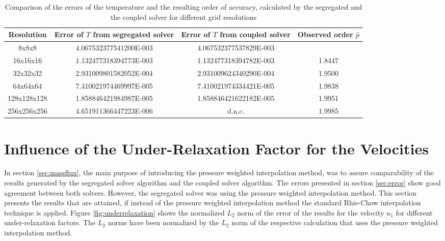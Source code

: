 \begin{table}[h!]\centering
{}
  \caption{Comparison of the errors of the temperature and the resulting order of accuracy, calculated by the segregated and the coupled solver for different grid resolutions}
  \begin{tabular}{cccc}\toprule
    Resolution & Error of \(T\) from segregated solver & Error of \(T\) from coupled solver & Observed order \(\hat{p}\) \\
    \midrule
    \rowcolor{tud0a} 8x8x8       & 4.067532377541200E-003  & 4.067532377537829E-003  &        \\%
    \rowcolor{black!00} 16x16x16    & 1.132477318394773E-003  & 1.132477318394782E-003  & 1.8447 \\%
    \rowcolor{tud0a} 32x32x32    & 2.931009801582052E-004  & 2.931009624340290E-004  & 1.9500 \\%
    \rowcolor{black!00} 64x64x64    & 7.410021974469997E-005  & 7.410021974334421E-005  & 1.9838 \\%
    \rowcolor{tud0a} 128x128x128 & 1.858846421984987E-005  & 1.858846421622182E-005  & 1.9951 \\%
    \rowcolor{black!00} 256x256x256 & 4.651911366447223E-006  & d.n.c.                  & 1.9985 \\%
  \end{tabular}
  \label{tab:temporder}
\end{table}

\section{Influence of the Under-Relaxation Factor for the Velocities}
\label{sec:independence}

In section \ref{sec:massflux}, the main purpose of introducing the pressure weighted interpolation method, was to assure comparability of the results generated by the segregated solver algorithm and the coupled solver algorithm. The errors presented in section \ref{sec:error} show good agreement between both solvers. However, the segregated solver was using the pressure weighted interpolation method. This section presents the results that are attained, if instead of the pressure weighted interpolation method the standard Rhie-Chow interpolation technique is applied. Figure \ref{fig:underrelaxation} shows the normalized \(L_2\) norm of the error of the results for the velocity \(u_1\) for different under-relaxation factors. The \(L_2\) norms have been normalized by the \(L_2\) norm of the respective calculation that uses the pressure weighted interpolation method. 

